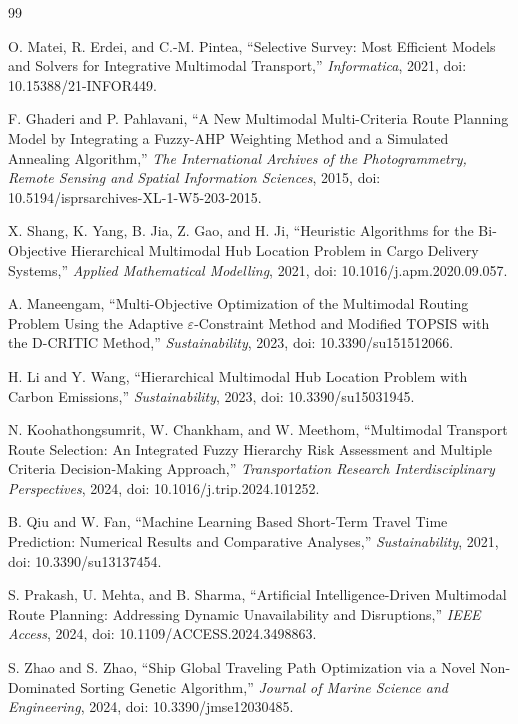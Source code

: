 \begin{thebibliography}{99}

O. Matei, R. Erdei, and C.-M. Pintea, ``Selective Survey: Most Efficient Models and Solvers for Integrative Multimodal Transport,'' \textit{Informatica}, 2021, doi: 10.15388/21-INFOR449.

F. Ghaderi and P. Pahlavani, ``A New Multimodal Multi-Criteria Route Planning Model by Integrating a Fuzzy-AHP Weighting Method and a Simulated Annealing Algorithm,'' \textit{The International Archives of the Photogrammetry, Remote Sensing and Spatial Information Sciences}, 2015, doi: 10.5194/isprsarchives-XL-1-W5-203-2015.

X. Shang, K. Yang, B. Jia, Z. Gao, and H. Ji, ``Heuristic Algorithms for the Bi-Objective Hierarchical Multimodal Hub Location Problem in Cargo Delivery Systems,'' \textit{Applied Mathematical Modelling}, 2021, doi: 10.1016/j.apm.2020.09.057.

A. Maneengam, ``Multi-Objective Optimization of the Multimodal Routing Problem Using the Adaptive $\varepsilon$-Constraint Method and Modified TOPSIS with the D-CRITIC Method,'' \textit{Sustainability}, 2023, doi: 10.3390/su151512066.

H. Li and Y. Wang, ``Hierarchical Multimodal Hub Location Problem with Carbon Emissions,'' \textit{Sustainability}, 2023, doi: 10.3390/su15031945.

N. Koohathongsumrit, W. Chankham, and W. Meethom, ``Multimodal Transport Route Selection: An Integrated Fuzzy Hierarchy Risk Assessment and Multiple Criteria Decision-Making Approach,'' \textit{Transportation Research Interdisciplinary Perspectives}, 2024, doi: 10.1016/j.trip.2024.101252.

B. Qiu and W. Fan, ``Machine Learning Based Short-Term Travel Time Prediction: Numerical Results and Comparative Analyses,'' \textit{Sustainability}, 2021, doi: 10.3390/su13137454.

S. Prakash, U. Mehta, and B. Sharma, ``Artificial Intelligence-Driven Multimodal Route Planning: Addressing Dynamic Unavailability and Disruptions,'' \textit{IEEE Access}, 2024, doi: 10.1109/ACCESS.2024.3498863.

S. Zhao and S. Zhao, ``Ship Global Traveling Path Optimization via a Novel Non-Dominated Sorting Genetic Algorithm,'' \textit{Journal of Marine Science and Engineering}, 2024, doi: 10.3390/jmse12030485.

\end{thebibliography}
